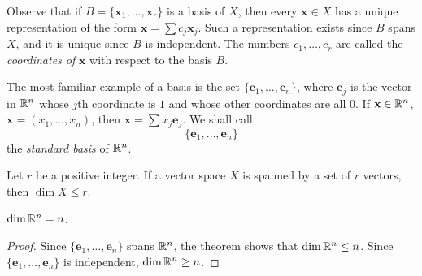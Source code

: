 \begin{myDef}
\begin{asparaenum}[(a)]
        Observe that if $B = \{\mathbf{x}_1, ... , \mathbf{x}_r\}$ is a basis of $X$, then every $\mathbf{x} \in X$ has a unique representation of the form $\mathbf{x} = \sum c_j \mathbf{x}_j$.
        Such a representation exists since $B$ spans $X$,
        and it is unique since $B$ is independent.
        The numbers $c_1, \dots, c_r$ are called the \emph{coordinates of} $\mathbf{x}$ with respect to the basis $B$.

        The most familiar example of a basis is the set $\{\mathbf{e}_1, \dots, \mathbf{e}_n\}$,
        where $\mathbf{e}_j$ is the vector in ${\protect\mathbb R}^n$ whose $j$th coordinate is $1$ and whose other coordinates are all $0$.
        If $\mathbf{x} \in {\protect\mathbb R}^n$, $\mathbf{x} = (x_1, \dots ,x_n)$,
        then $\mathbf{x} = \sum x_j \mathbf{e}_j$.
        We shall call 
        \begin{equation*}
            \{\mathbf{e}_1, \dots , \mathbf{e}_n\}
        \end{equation*}
        the \emph{standard basis} of ${\protect\mathbb R}^n$.
    \end{asparaenum}

\end{myDef}


\begin{thm}
    \label{thm:9.2}
    Let $r$ be a positive integer. 
    If a vector space $X$ is spanned by a set of $r$ vectors, 
    then $\dim X \leq r$.
\end{thm}


\begin{myCorollary*}
    $\dim {\protect\mathbb R}^n = n$.
\end{myCorollary*}

\begin{proof}
    Since $\{\mathbf{e}_1, \dots , \mathbf{e}_n\}$ spans ${\protect\mathbb R}^n$,
    the theorem shows that $\dim {\protect\mathbb R}^n \leq n$.
    Since $\{\mathbf{e}_1, \dots , \mathbf{e}_n\}$ is independent,
    $\dim {\protect\mathbb R}^n \geq n$.
\end{proof}

